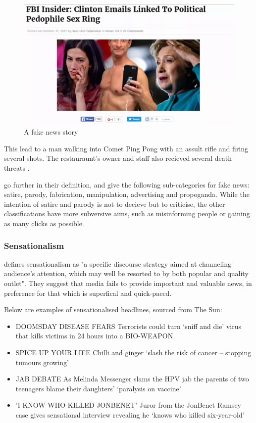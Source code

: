 \begin{figure}[h!]
  \includegraphics[width=\linewidth]{images/fakenews.png}
  \caption{A fake news story}
  \label{fig:fakenews}
\end{figure}


This lead to a man walking into Comet Ping Pong with an assult rifle and firing several shots. The restauraunt's owner and staff also recieved several death threats \cite{lopez2016}. 

\citeauthor{allcott2017} go further in their definition, and give the following sub-categories for fake news: satire, parody, fabrication, manipulation, advertising and propoganda. While the intention of satire and parody is not to decieve but to criticise, the other classifications have more subversive aims, such as misinforming people or gaining as many clicks as possible.

\subsubsection{Sensationalism}
 defines sensationalism as "a specific discourse strategy  aimed  at  channeling  audience's  attention,  which  may  well  be  resorted  to  by  both  popular and quality outlet". They suggest that media fails to provide important and valuable news, in preference for that which is superfical and quick-paced.


Below are examples of sensationalised headlines, sourced from The Sun:

\begin{itemize}
	\item DOOMSDAY DISEASE FEARS Terrorists could turn ‘sniff and die’ virus that kills victims in 24 hours into a BIO-WEAPON
	\item SPICE UP YOUR LIFE Chilli and ginger ‘slash the risk of cancer – stopping tumours growing’
	\item JAB DEBATE As Melinda Messenger slams the HPV jab the parents of two teenagers blame their daughters’ ‘paralysis on vaccine’
	\item 'I KNOW WHO KILLED JONBENET' Juror from the JonBenet Ramsey case gives sensational interview revealing he ‘knows who killed six-year-old’
	
\end{itemize}

